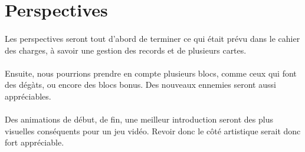 \section{Perspectives}

\paragraph{} Les perspectives seront tout d'abord de terminer ce qui était prévu dans le cahier des charges, à savoir une gestion des records et de plusieurs cartes.
\paragraph{} Ensuite, nous pourrions prendre en compte plusieurs blocs, comme ceux qui font des dégàts, ou encore des blocs bonus. Des nouveaux ennemies seront aussi appréciables.
\paragraph{} Des animations de début, de fin, une meilleur introduction seront des plus visuelles conséquents pour un jeu vidéo. Revoir donc le côté artistique serait donc fort appréciable.
